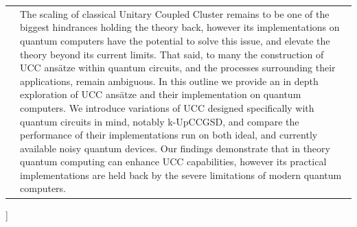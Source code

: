 \documentclass[twoside,twocolumn,9pt]{article}
\begin{document}
\begin{@twocolumnfalse}
\begin{tabular}{m{4.5cm} p{13.5cm} }
& \noindent\normalsize{The scaling of classical Unitary Coupled Cluster remains to be one of the biggest hindrances holding the theory back, however its implementations on quantum computers have the potential to solve this issue, and elevate the theory beyond its current limits. That said, to many the construction of UCC ansätze within quantum circuits, and the processes surrounding their applications, remain ambiguous. In this outline we provide an in depth exploration of UCC ansätze and their implementation on quantum computers. We introduce variations of UCC designed specifically with quantum circuits in mind, notably k-UpCCGSD, and compare the performance of their implementations run on both ideal, and currently available noisy quantum devices. Our findings demonstrate that in theory quantum computing can enhance UCC capabilities, however its practical implementations are held back by the severe limitations of modern quantum computers.} \\
\end{tabular}

\end{@twocolumnfalse} \vspace{1.6cm}

]

\renewcommand*\rmdefault{bch}\normalfont\upshape
\rmfamily
\section*{}
\vspace{-1cm}



\end{document}
